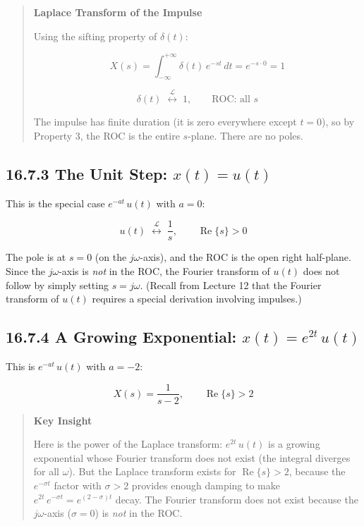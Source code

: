 \documentclass[11pt]{article}
\begin{document}
\begin{quote}
\textbf{Laplace Transform of the Impulse}

Using the sifting property of $\delta(t)$:

\[X(s) = \int_{-\infty}^{+\infty} \delta(t)\,e^{-st}\,dt = e^{-s\cdot 0} = 1\]

\[\boxed{\,\delta(t) \;\overset{\mathcal{L}}{\longleftrightarrow}\; 1, \qquad \text{ROC: all } s\,}\]

The impulse has finite duration (it is zero everywhere except $t = 0$), so by Property 3, the ROC is the entire $s$-plane. There are no poles.
\end{quote}

\subsection*{16.7.3 The Unit Step: $x(t) = u(t)$}

This is the special case $e^{-at}\,u(t)$ with $a = 0$:

\[\boxed{\,u(t) \;\overset{\mathcal{L}}{\longleftrightarrow}\; \frac{1}{s}, \qquad \operatorname{Re}\{s\} > 0\,}\]

The pole is at $s = 0$ (on the $j\omega$-axis), and the ROC is the open right half-plane. Since the $j\omega$-axis is \textit{not} in the ROC, the Fourier transform of $u(t)$ does not follow by simply setting $s = j\omega$. (Recall from Lecture 12 that the Fourier transform of $u(t)$ requires a special derivation involving impulses.)

\subsection*{16.7.4 A Growing Exponential: $x(t) = e^{2t}\,u(t)$}

This is $e^{-at}\,u(t)$ with $a = -2$:

\[X(s) = \frac{1}{s-2}, \qquad \operatorname{Re}\{s\} > 2\]

\begin{quote}
\textbf{Key Insight}

Here is the power of the Laplace transform: $e^{2t}\,u(t)$ is a growing exponential whose Fourier transform does not exist (the integral diverges for all $\omega$). But the Laplace transform exists for $\operatorname{Re}\{s\} > 2$, because the $e^{-\sigma t}$ factor with $\sigma > 2$ provides enough damping to make $e^{2t}\,e^{-\sigma t} = e^{(2-\sigma)t}$ decay. The Fourier transform does not exist because the $j\omega$-axis ($\sigma = 0$) is \textit{not} in the ROC.
\end{quote}
\end{document}
